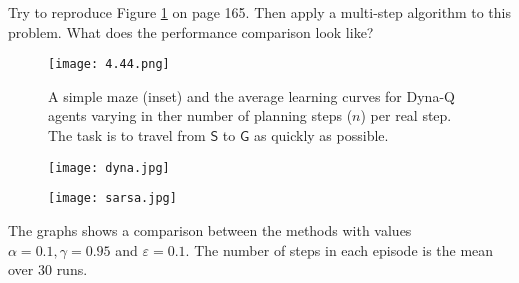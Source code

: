 
\begin{exercise}

Try to reproduce Figure \ref{fig:8.2} on page 165.
Then apply a multi-step algorithm to this problem.
What does the performance comparison look like?

\setcounter{section}{8}
\setcounter{figure}{1}

\begin{figure}[H]
    \centering
    \texttt{[image: 4.44.png]}
    \caption
    {
        A simple maze (inset) and the average learning curves for Dyna-Q agents varying in ther number of planning steps ($n$) per real step.
        The task is to travel from $\mathsf S$ to $\mathsf G$ as quickly as possible.
    }
    \label{fig:8.2}
\end{figure}
\end{exercise}


\begin{solution}

\begin{figure}[H]
\centering
\begin{minipage}{.5\textwidth}
  \centering
  \texttt{[image: dyna.jpg]}
  \label{fig:test1}
\end{minipage}%
\begin{minipage}{.5\textwidth}
  \centering
  \texttt{[image: sarsa.jpg]}
  \label{fig:test2}
\end{minipage}
\end{figure}

The graphs shows a comparison between the methods with values $\alpha = 0.1, \gamma = 0.95$ and $\varepsilon = 0.1$. The number of steps in each episode is the mean over 30 runs.
\end{solution}

